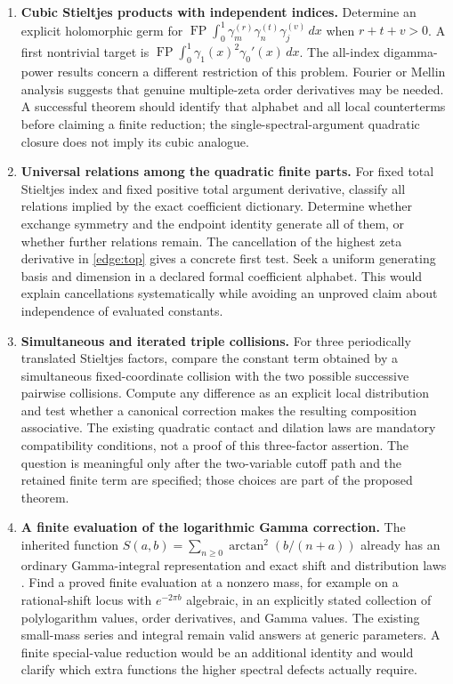 \documentclass[11pt,letterpaper]{article}
\numberwithin{equation}{section}
\theoremstyle{definition}
\theoremstyle{remark}
\DeclareMathOperator{\FP}{FP}
\begin{document}
\begin{enumerate}[leftmargin=*,label=\textbf{R\arabic*.}]
\item \textbf{Cubic Stieltjes products with independent indices.}
Determine an explicit holomorphic germ for
$\FP\int_0^1\gamma_m^{(r)}\gamma_n^{(t)}\gamma_j^{(v)}\,dx$
when $r+t+v>0$. A first nontrivial target is
$\FP\int_0^1\gamma_1(x)^2\gamma_0'(x)\,dx$.
The all-index digamma-power results concern a different restriction
of this problem. Fourier or Mellin analysis suggests that genuine
multiple-zeta order derivatives may be needed. A successful theorem
should identify that alphabet and all local counterterms before
claiming a finite reduction; the single-spectral-argument quadratic
closure does not imply its cubic analogue.

\item \textbf{Universal relations among the quadratic finite parts.}
For fixed total Stieltjes index and fixed positive total argument
derivative, classify all relations implied by the exact coefficient
dictionary. Determine whether exchange symmetry and the endpoint
identity generate all of them, or whether further relations remain.
The cancellation of the highest zeta derivative in
\eqref{edge:top} gives a concrete first test. Seek a uniform generating
basis and dimension in a declared formal coefficient alphabet. This
would explain cancellations systematically while avoiding an
unproved claim about independence of evaluated constants.

\item \textbf{Simultaneous and iterated triple collisions.}
For three periodically translated Stieltjes factors, compare the
constant term obtained by a simultaneous fixed-coordinate collision
with the two possible successive pairwise collisions. Compute any
difference as an explicit local distribution and test whether a
canonical correction makes the resulting composition associative.
The existing quadratic contact and dilation laws
\cite{manuscript} are mandatory compatibility conditions, not a proof
of this three-factor assertion. The question is meaningful only
after the two-variable cutoff path and the retained finite term are
specified; those choices are part of the proposed theorem.

\item \textbf{A finite evaluation of the logarithmic Gamma correction.}
The inherited function
$S(a,b)=\sum_{n\ge0}\arctan^2(b/(n+a))$ already has an ordinary
Gamma-integral representation and exact shift and distribution laws
\cite{tail-alternating}. Find a proved finite evaluation at a
nonzero mass, for example on a rational-shift locus with
$e^{-2\pi b}$ algebraic, in an explicitly stated collection of
polylogarithm values, order derivatives, and Gamma values. The
existing small-mass series and integral remain valid answers at
generic parameters. A finite special-value reduction would be an
additional identity and would clarify which extra functions the
higher spectral defects actually require.

\end{enumerate}
\end{document}
